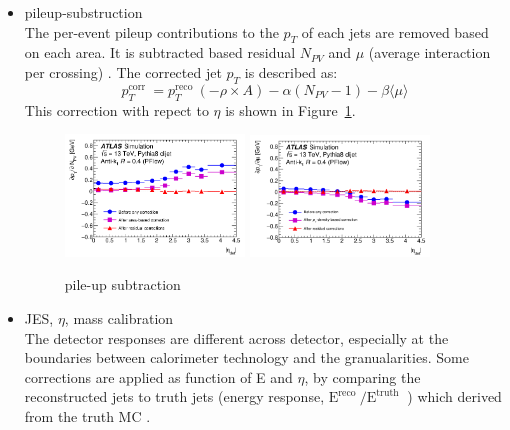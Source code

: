 \begin{itemize}
    \item pileup-substruction \\
    The per-event pileup contributions to the $p_T$ of each jets are removed based on each area. It is subtracted based residual $N_{PV}$ and $\mu$ (average interaction per crossing) \cite{JETM-2018-05}.
    The corrected jet $p_T$ is described as:
    \begin{equation}
     p_{T}^{\text {corr }}=p_{T}^{\text {reco }}(-\rho \times A)-\alpha\left(N_{P V}-1\right)-\beta\langle\mu\rangle
    \end{equation}
    This correction with repect to $\eta$ is shown in Figure~\ref{fig:pileup}.
    \begin{figure}[tbp]
    \begin{center}
    \includegraphics[width=0.45\textwidth,keepaspectratio]{figures/Reconstruction/intimepileup}
    \includegraphics[width=0.45\textwidth,keepaspectratio]{figures/Reconstruction/outtimepileup}
    \caption{
    pile-up subtraction \cite{JETM-2018-05}
    }
    \label{fig:pileup}
    \end{center}
    \end{figure}
    \item JES, $\eta$, mass calibration \\
    The detector responses are different across detector, especially at the boundaries between calorimeter technology and the granualarities. Some corrections are applied as function of E and $\eta$, by comparing the reconstructed jets to truth jets (energy response, $\mathrm{E}^{\text {reco }} / \mathrm{E}^{\text {truth }}$ ) which derived from the truth MC \cite{JETM-2018-05}.

\end{itemize}
